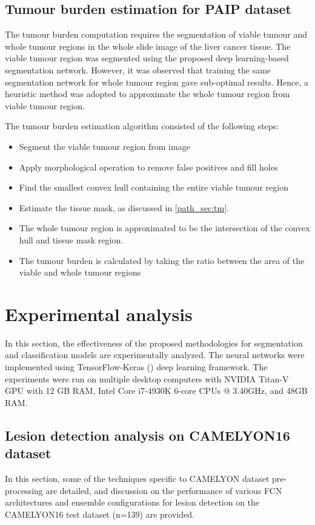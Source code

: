 \documentclass[times,twocolumn,final,authoryear]{tmp}
\begin{document}
\subsection{Tumour burden estimation for PAIP dataset}
\label{path_sec:path_tumorburden}


The tumour burden computation requires the segmentation of viable tumour and whole tumour regions in the whole slide image of the liver cancer tissue. The viable tumour region was segmented using the proposed deep learning-based segmentation network. However, it was observed that training the same segmentation network for whole tumour region gave sub-optimal results. Hence, a heuristic method was adopted to approximate the whole tumour region from viable tumour region.

The tumour burden estimation algorithm consisted of the following steps:
\begin{itemize}
    \item Segment the viable tumour region from image
\item Apply morphological operation to remove false positives and fill holes
    \item Find the smallest convex hull containing the entire viable tumour region
    \item Estimate the tissue mask, as discussed in \ref{path_sec:tm}.  
    \item The whole tumour region is approximated to be the intersection of the convex hull and tissue mask region.
    \item The tumour burden is calculated by taking the ratio between the area of the viable and whole tumour regions
\end{itemize}


\section{Experimental analysis}
\label{path_sec:expi_analysis}
In this section, the effectiveness of the proposed methodologies for segmentation and classification models are experimentally analyzed. The neural networks were implemented using TensorFlow-Keras (\citep{abadi2016tensorflow}) deep learning framework. The experiments were run on multiple desktop computers with NVIDIA Titan-V GPU with 12 GB RAM, Intel Core i7-4930K 6-core CPUs @ 3.40GHz, and 48GB RAM. 


\subsection{Lesion detection analysis on CAMELYON16 dataset}
In this section, some of the techniques specific to CAMELYON dataset pre-processing are detailed, and discussion on the performance of various FCN architectures and ensemble configurations for lesion detection on the CAMELYON16 test dataset (n=139) are provided.
\end{document}
